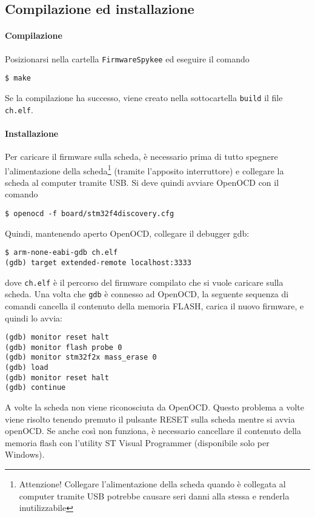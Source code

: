 \subsection*{Compilazione ed installazione}

\paragraph{Compilazione} Posizionarsi nella cartella \verb|FirmwareSpykee| ed eseguire il comando
\begin{verbatim}
$ make
\end{verbatim}
Se la compilazione ha successo, viene creato nella sottocartella \verb|build| il file \verb|ch.elf|.

\paragraph{Installazione} Per caricare il firmware sulla scheda, è necessario prima di tutto spegnere l'alimentazione della scheda\footnote{Attenzione! Collegare l'alimentazione della scheda quando è collegata al computer tramite USB potrebbe causare seri danni alla stessa e renderla inutilizzabile} (tramite l'apposito interruttore) e collegare la scheda al computer tramite USB. Si deve quindi avviare OpenOCD con il comando
\begin{verbatim}
$ openocd -f board/stm32f4discovery.cfg
\end{verbatim}
Quindi, mantenendo aperto OpenOCD, collegare il debugger gdb:
\begin{verbatim}
$ arm-none-eabi-gdb ch.elf
(gdb) target extended-remote localhost:3333
\end{verbatim}
dove \verb|ch.elf| è il percorso del firmware compilato che si vuole caricare sulla scheda. Una volta che \verb|gdb| è connesso ad OpenOCD, la seguente sequenza di comandi cancella il contenuto della memoria FLASH, carica il nuovo firmware, e quindi lo avvia:
\begin{verbatim}
(gdb) monitor reset halt
(gdb) monitor flash probe 0 
(gdb) monitor stm32f2x mass_erase 0 
(gdb) load 
(gdb) monitor reset halt 
(gdb) continue
\end{verbatim}

\begin{nota} A volte la scheda non viene riconosciuta da OpenOCD. Questo problema a volte viene risolto tenendo premuto il pulsante RESET sulla scheda mentre si avvia openOCD. Se anche così non funziona, è necessario cancellare il contenuto della memoria flash con l'utility ST Visual Programmer (disponibile solo per Windows).
\end{nota}

